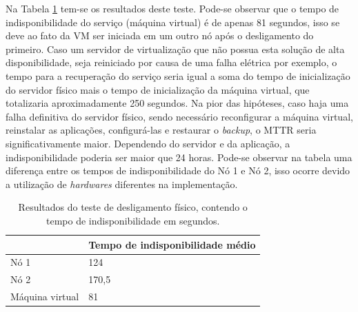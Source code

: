 Na Tabela \ref{tab:teste1resultados} tem-se os resultados deste teste. Pode-se observar que o tempo de indisponibilidade do serviço 
(máquina virtual) é de apenas 81 segundos, isso se deve ao fato da \ac{VM} ser iniciada em um outro nó após o desligamento do primeiro. 
Caso um servidor de virtualização que não possua esta solução de alta disponibilidade, seja reiniciado por causa de uma falha elétrica por 
exemplo, o tempo para a recuperação do serviço seria igual a soma do tempo de inicialização do servidor físico mais o tempo de inicialização 
da máquina virtual, que totalizaria aproximadamente 250 segundos. 
Na pior das hipóteses, caso haja uma falha definitiva do servidor físico, sendo necessário reconfigurar a máquina virtual, reinstalar as aplicações,
configurá-las e restaurar o \textit{backup}, o \ac{MTTR} seria significativamente maior. Dependendo do servidor e da aplicação, 
a indisponibilidade poderia ser maior que 24 horas.
Pode-se observar na tabela uma diferença entre os tempos de indisponibilidade do Nó 1 e Nó 2, isso ocorre devido a utilização de \textit{hardwares}
diferentes na implementação. 



\begin{table}[h!]
\caption{Resultados do teste de desligamento físico, contendo o tempo de indisponibilidade em segundos.}
\small
\label{tab:teste1resultados}
\begin{center}
\begin{tabular}{|l|l|}\hline
 & \textbf{Tempo de indisponibilidade médio} \\\hline %
Nó 1 & 124 \\\hline %
Nó 2 & 170,5 \\\hline %
Máquina virtual & 81 \\\hline %
\end{tabular}
\end{center}
\end{table}


